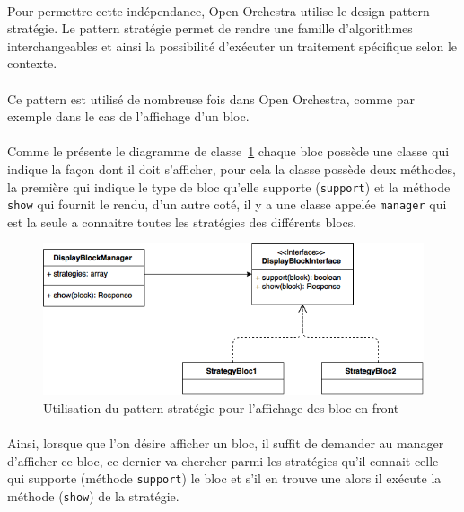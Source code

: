 	       \paragraph{}
	       Pour permettre cette indépendance, Open Orchestra utilise le design pattern stratégie. Le pattern stratégie permet de rendre une famille d'algorithmes interchangeables et ainsi  la possibilité d'exécuter un traitement spécifique selon le contexte.
	       	 \paragraph{}
	       	 Ce pattern est utilisé de nombreuse fois dans Open Orchestra, comme par exemple dans le cas de l'affichage d'un bloc.
          \paragraph{}
	       Comme le présente le diagramme de classe~\ref{pattern strategy} chaque bloc possède une classe qui indique la façon dont il doit s'afficher, pour cela la classe possède deux méthodes, la première qui indique le type de bloc qu'elle supporte (\verb?support?) et la méthode \verb?show? qui fournit le rendu, d'un autre coté, il y a une classe appelée \verb?manager?  qui est la seule a connaitre toutes les stratégies des différents blocs. 
		\begin{figure}[H]
        \begin{center}
          \includegraphics[scale=0.75]{images/strategy_block}
        \end{center}
        \caption{Utilisation du pattern stratégie pour l'affichage des bloc en front}
        \label{pattern strategy}
      \end{figure}
         \paragraph{}
	       Ainsi, lorsque que l'on désire afficher un bloc, il suffit de demander au manager d'afficher ce bloc, ce dernier va chercher parmi les stratégies qu'il connait celle qui supporte (méthode \verb?support?) le bloc et s'il en trouve une alors il exécute la méthode (\verb?show?) de la stratégie.
	        
